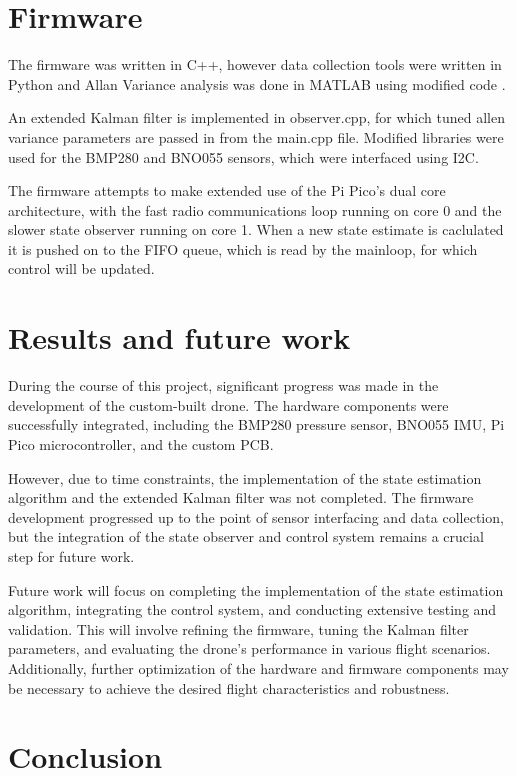 \documentclass{article}
\begin{document}
\section{Firmware}

The firmware was written in C++, however data collection tools were written in Python and Allan Variance analysis was done in MATLAB using modified code \cite{error_modelling}.

An extended Kalman filter is implemented in observer.cpp, for which tuned allen variance parameters are passed in from the main.cpp file.
Modified libraries were used for the BMP280 and BNO055 sensors, which were interfaced using I2C.

The firmware attempts to make extended use of the Pi Pico's dual core architecture, with the fast radio communications loop running on core 0 and the slower state observer running on core 1.
When a new state estimate is caclulated it is pushed on to the FIFO queue, which is read by the mainloop, for which control will be updated.

\section{Results and future work}

During the course of this project, significant progress was made in the development of the custom-built drone. The hardware components were successfully integrated, including the BMP280 pressure sensor, BNO055 IMU, Pi Pico microcontroller, and the custom PCB. 

However, due to time constraints, the implementation of the state estimation algorithm and the extended Kalman filter was not completed. The firmware development progressed up to the point of sensor interfacing and data collection, but the integration of the state observer and control system remains a crucial step for future work.

Future work will focus on completing the implementation of the state estimation algorithm, integrating the control system, and conducting extensive testing and validation. This will involve refining the firmware, tuning the Kalman filter parameters, and evaluating the drone's performance in various flight scenarios. Additionally, further optimization of the hardware and firmware components may be necessary to achieve the desired flight characteristics and robustness.

\newpage
\section{Conclusion}
\end{document}
